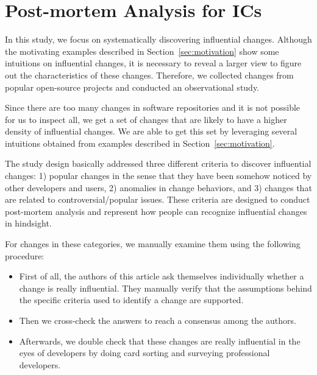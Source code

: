 

\section{Post-mortem Analysis for IC{\scriptsize s}}
\label{sec:preliminary}
In this study, we focus on systematically discovering influential
changes.  Although the motivating examples described in
Section~\ref{sec:motivation} show some intuitions on influential
changes, it is necessary to reveal a larger view to figure out the
characteristics of these changes. Therefore, we collected
\numChanges changes from
\numSubjects popular open-source projects and conducted an observational study.


Since there are too many changes in software repositories and it is not
possible for us to inspect all, we get a set of changes that are likely to
have a higher density of influential changes. We are able to get this set by
leveraging several intuitions obtained from examples described in
Section~\ref{sec:motivation}.

The study design basically addressed three different criteria to
discover influential changes: 1) popular changes in the sense that they
have been somehow noticed by other developers and users,
2) anomalies in change behaviors, and 3) changes that are related to controversial/popular issues. 
These criteria are designed to conduct post-mortem analysis and represent how people
can recognize influential changes in hindsight.

For changes in these categories, we manually examine them using the following
procedure:
\begin{itemize}
	\item First of all, the authors of this article ask themselves individually whether a change is really influential.
	They manually verify that the assumptions behind the specific criteria used to identify a change are supported.
	\item Then we cross-check the answers to reach a consensus among the authors.
\item Afterwards, we double check that these changes are really influential in
the eyes of developers by doing card sorting and surveying professional
developers.
\end{itemize}


